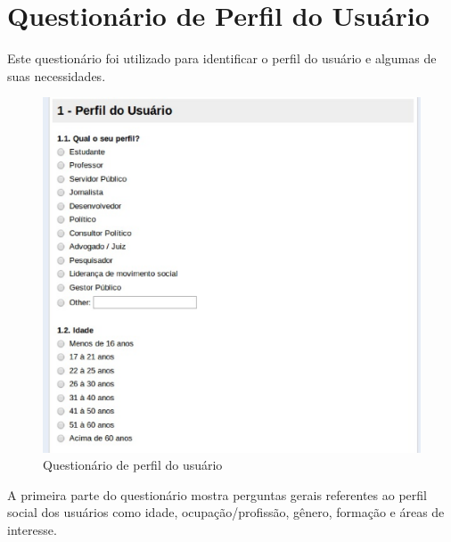 \section{Questionário de Perfil do Usuário}

	Este questionário foi utilizado para identificar o perfil do usuário e algumas de suas necessidades. 




\begin{figure}[h]
    \centering
    \includegraphics[keepaspectratio=true,scale=0.60]
      {figuras/perf1.eps}
	\caption{Questionário de perfil do usuário}
    \label{perfilgeral}
\end{figure}
%
%
\newpage


A primeira parte do questionário mostra perguntas gerais referentes ao perfil social dos usuários como idade, ocupação/profissão, gênero, formação  e áreas de interesse.




